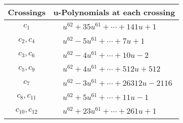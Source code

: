 \documentclass[1p]{elsarticle_modified}
\theoremstyle{definition}
\begin{document}
\begin{tabular}{m{50pt}|m{274pt}}
Crossings & \hspace{64pt}u-Polynomials at each crossing \\
\hline $$\begin{aligned}c_{1}\end{aligned}$$&$\begin{aligned}
&u^{62}+35 u^{61}+\cdots+141 u+1
\end{aligned}$\\
\hline $$\begin{aligned}c_{2},c_{4}\end{aligned}$$&$\begin{aligned}
&u^{62}-5 u^{61}+\cdots+7 u+1
\end{aligned}$\\
\hline $$\begin{aligned}c_{3},c_{6}\end{aligned}$$&$\begin{aligned}
&u^{62}-4 u^{61}+\cdots+10 u-2
\end{aligned}$\\
\hline $$\begin{aligned}c_{5},c_{9}\end{aligned}$$&$\begin{aligned}
&u^{62}+4 u^{61}+\cdots+512 u+512
\end{aligned}$\\
\hline $$\begin{aligned}c_{7}\end{aligned}$$&$\begin{aligned}
&u^{62}-3 u^{61}+\cdots+26312 u-2116
\end{aligned}$\\
\hline $$\begin{aligned}c_{8},c_{11}\end{aligned}$$&$\begin{aligned}
&u^{62}+5 u^{61}+\cdots+11 u-1
\end{aligned}$\\
\hline $$\begin{aligned}c_{10},c_{12}\end{aligned}$$&$\begin{aligned}
&u^{62}+23 u^{61}+\cdots+261 u+1
\end{aligned}$\\
\hline
\end{tabular}\\~\\
\newpage\renewcommand{\arraystretch}{1}
\end{document}
